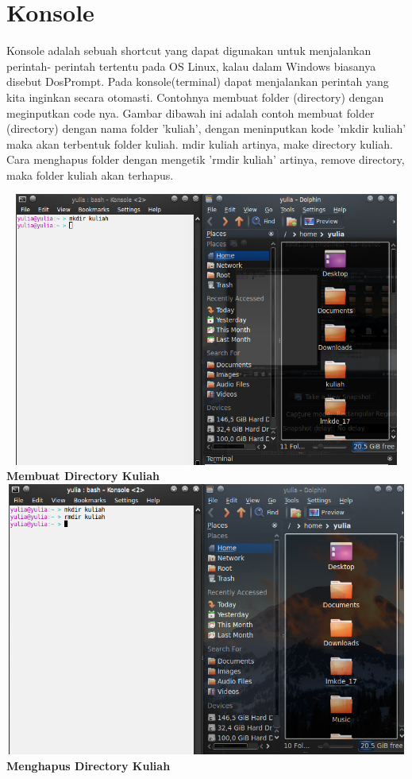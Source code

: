 \documentclass[11pt,fleqn]{book} %
\begin{document}
\section{Konsole}
\hspace{10pt} Konsole adalah sebuah shortcut yang dapat digunakan untuk menjalankan perintah- perintah tertentu pada OS Linux, kalau dalam Windows biasanya disebut DosPrompt. 
Pada konsole(terminal) dapat menjalankan perintah yang kita inginkan secara otomasti. Contohnya membuat folder (directory) dengan meginputkan code nya. 
Gambar dibawah ini adalah contoh membuat folder (directory) dengan nama folder 'kuliah', dengan meninputkan kode 'mkdir kuliah' maka akan terbentuk folder kuliah.
mdir kuliah artinya, make directory kuliah. Cara menghapus folder dengan mengetik 'rmdir kuliah' artinya, remove directory, maka folder kuliah akan terhapus.
\begin{center}
\includegraphics[width=14cm,height=9cm]{konsole.png}\\
\textbf{Membuat Directory Kuliah}\\
\includegraphics[width=14cm,height=9cm]{konsole1.png}\\
 \textbf{Menghapus Directory Kuliah}\\
\end{center}
\end{document}
